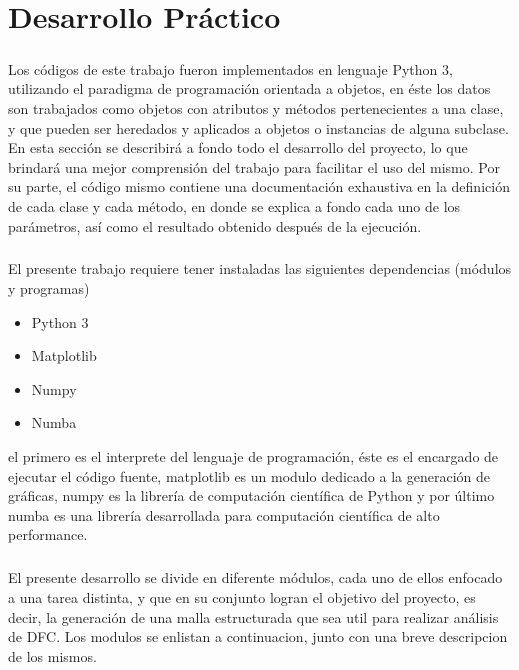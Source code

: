 \documentclass[letterpaper, openright, 12pt]{book}
\begin{document}
\chapter{Desarrollo Práctico}
    \paragraph*{}
    Los códigos de este trabajo fueron implementados en lenguaje Python 3,
    utilizando el paradigma de programación orientada a objetos, en éste los
    datos son trabajados como objetos con atributos y métodos pertenecientes
    a una clase, y que pueden ser heredados y aplicados a objetos o
    instancias de alguna subclase. En esta sección se describirá a fondo todo
    el desarrollo del proyecto, lo que brindará una mejor comprensión del
    trabajo para facilitar el uso del mismo. Por su parte, el código mismo
    contiene una documentación exhaustiva en la definición de cada clase y
    cada método, en donde se explica a fondo cada uno de los parámetros, así
    como el resultado obtenido después de la ejecución.

    \paragraph*{}
    El presente trabajo requiere tener instaladas las siguientes dependencias
    (módulos y programas)
    \begin{itemize}
        \item Python 3
        \item Matplotlib
        \item Numpy
        \item Numba
    \end{itemize}
    el primero es el interprete del lenguaje de programación, éste es el
    encargado de ejecutar el código fuente, matplotlib es un modulo dedicado
    a la generación de gráficas, numpy es la librería de computación
    científica de Python y por último numba es una librería desarrollada
    para computación científica de alto performance.

    \paragraph*{}
    El presente desarrollo se divide en diferente módulos, cada uno de ellos
    enfocado a una tarea distinta, y que en su conjunto logran el objetivo del
    proyecto, es decir, la generación de una malla estructurada que sea util
    para realizar análisis de DFC\@. Los modulos se enlistan a continuacion,
    junto con una breve descripcion de los mismos.
\end{document}

